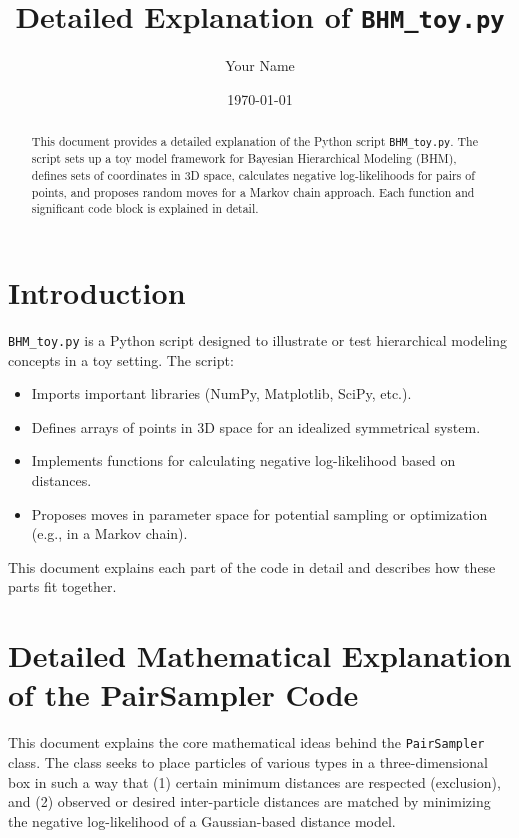 \documentclass[12pt]{article}
\title{Detailed Explanation of \texttt{BHM\_toy.py}}
\author{Your Name}
\date{\today}
\begin{document}
\maketitle

\begin{abstract}
This document provides a detailed explanation of the Python script \texttt{BHM\_toy.py}. The script sets up a toy model framework for Bayesian Hierarchical Modeling (BHM), defines sets of coordinates in 3D space, calculates negative log-likelihoods for pairs of points, and proposes random moves for a Markov chain approach. Each function and significant code block is explained in detail.
\end{abstract}

\tableofcontents

\section{Introduction}
\texttt{BHM\_toy.py} is a Python script designed to illustrate or test hierarchical modeling concepts in a toy setting. The script:

\begin{itemize}
    \item Imports important libraries (NumPy, Matplotlib, SciPy, etc.).
    \item Defines arrays of points in 3D space for an idealized symmetrical system.
    \item Implements functions for calculating negative log-likelihood based on distances.
    \item Proposes moves in parameter space for potential sampling or optimization (e.g., in a Markov chain).
\end{itemize}

This document explains each part of the code in detail and describes how these parts fit together.

\section*{Detailed Mathematical Explanation of the PairSampler Code}

This document explains the core mathematical ideas behind the \texttt{PairSampler} class. The class seeks to place particles of various types in a three-dimensional box in such a way that (1) certain minimum distances are respected (exclusion), and (2) observed or desired inter-particle distances are matched by minimizing the negative log-likelihood of a Gaussian-based distance model.
\end{document}
